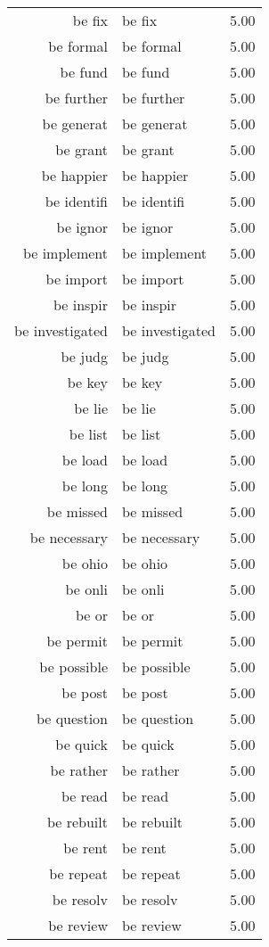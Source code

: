 \begin{table}[ht]
\begin{tabular}{rlr}
  be fix & be fix & 5.00 \\ 
  be formal & be formal & 5.00 \\ 
  be fund & be fund & 5.00 \\ 
  be further & be further & 5.00 \\ 
  be generat & be generat & 5.00 \\ 
  be grant & be grant & 5.00 \\ 
  be happier & be happier & 5.00 \\ 
  be identifi & be identifi & 5.00 \\ 
  be ignor & be ignor & 5.00 \\ 
  be implement & be implement & 5.00 \\ 
  be import & be import & 5.00 \\ 
  be inspir & be inspir & 5.00 \\ 
  be investigated & be investigated & 5.00 \\ 
  be judg & be judg & 5.00 \\ 
  be key & be key & 5.00 \\ 
  be lie & be lie & 5.00 \\ 
  be list & be list & 5.00 \\ 
  be load & be load & 5.00 \\ 
  be long & be long & 5.00 \\ 
  be missed & be missed & 5.00 \\ 
  be necessary & be necessary & 5.00 \\ 
  be ohio & be ohio & 5.00 \\ 
  be onli & be onli & 5.00 \\ 
  be or & be or & 5.00 \\ 
  be permit & be permit & 5.00 \\ 
  be possible & be possible & 5.00 \\ 
  be post & be post & 5.00 \\ 
  be question & be question & 5.00 \\ 
  be quick & be quick & 5.00 \\ 
  be rather & be rather & 5.00 \\ 
  be read & be read & 5.00 \\ 
  be rebuilt & be rebuilt & 5.00 \\ 
  be rent & be rent & 5.00 \\ 
  be repeat & be repeat & 5.00 \\ 
  be resolv & be resolv & 5.00 \\ 
  be review & be review & 5.00 \\ 

\end{tabular}
\end{table}
